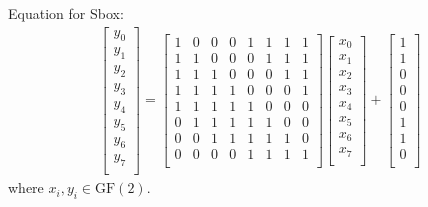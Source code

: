 \documentclass[11pt,oneside,final]{fithesis2}
\begin{document}
	Equation for Sbox:
	\begin{align}
		\begin{bmatrix}
		    y_0\\
		    y_1\\
		    y_2\\
		    y_3\\
		    y_4\\
		    y_5\\
		    y_6\\
		    y_7\\
		\end{bmatrix}
		    =
		\begin{bmatrix}
		    1 & 0 & 0 & 0 & 1 & 1 & 1 & 1 \\
		    1 & 1 & 0 & 0 & 0 & 1 & 1 & 1 \\
		    1 & 1 & 1 & 0 & 0 & 0 & 1 & 1 \\
		    1 & 1 & 1 & 1 & 0 & 0 & 0 & 1 \\
		    1 & 1 & 1 & 1 & 1 & 0 & 0 & 0 \\
		    0 & 1 & 1 & 1 & 1 & 1 & 0 & 0 \\
		    0 & 0 & 1 & 1 & 1 & 1 & 1 & 0 \\
		    0 & 0 & 0 & 0 & 1 & 1 & 1 & 1 \\
		\end{bmatrix}
		\begin{bmatrix}
		    x_0\\
		    x_1\\
		    x_2\\
		    x_3\\
		    x_4\\
		    x_5\\
		    x_6\\
		    x_7\\
		\end{bmatrix}
		    +
		\begin{bmatrix}
		    1\\
		    1\\
		    0\\
		    0\\
		    0\\
		    1\\
		    1\\
		    0\\
		\end{bmatrix}
	    \end{align}
	where $x_i, y_i \in \text{GF}(2)$.
\end{document}
